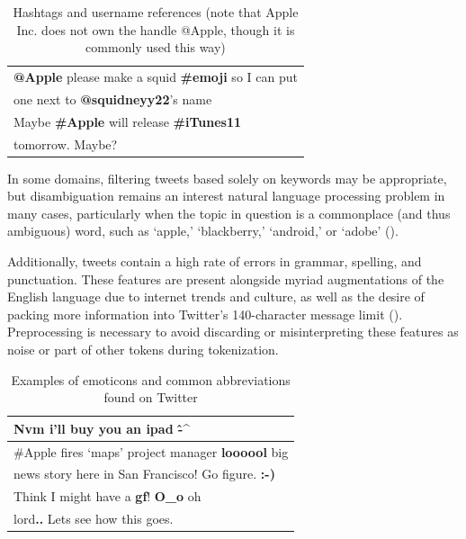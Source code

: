 \documentclass[letterpaper]{article}
\begin{document}
\begin{table}[h]
\centering
\begin{tabular}{|l|}
	\hline
\textbf{@Apple} please make a squid \textbf{\#emoji} so I can put \\
one next to \textbf{@squidneyy22}'s name\\ \hline
Maybe \textbf{\#Apple} will release \textbf{\#iTunes11} \\
tomorrow. Maybe? \\ \hline
\end{tabular}
\caption{Hashtags and username references (note that Apple Inc. does not own the handle @Apple, though it is commonly used this way)}
\label{tab:myfirsttable}
\end{table}

In some domains, filtering tweets based solely on keywords may be appropriate, but disambiguation remains an interest natural language processing problem in many cases, particularly when the topic in question is a commonplace (and thus ambiguous) word, such as `apple,' `blackberry,' `android,' or `adobe' (\citeauthor{journals/ijcsa/YervaMA12}). 

Additionally, tweets contain a high rate of errors in grammar, spelling, and punctuation. These features are present alongside myriad augmentations of the English language due to internet trends and culture, as well as the desire of packing more information into Twitter's 140-character message limit (\citeauthor{Laboreiro:2010:TMM:1871840.1871853}). Preprocessing is necessary to avoid discarding or misinterpreting these features as noise or part of other tokens during tokenization.

\begin{table}[h]
\centering
\begin{tabular}{|l|}
	\hline
\textbf{Nvm} i'll buy you an ipad \textbf{\^-\^} \\ \hline
\#Apple fires `maps' project manager \textbf{loooool} big \\
 news story here in San Francisco! Go figure. \textbf{:-)} \\ \hline
Think I might have a \textbf{gf}! \textbf{O\_o} oh \\
lord\textbf{..} Lets see how this goes. \\ \hline
\end{tabular}
\caption{Examples of emoticons and common abbreviations found on Twitter}
\label{tab:myfirsttable}
\end{table}
\end{document}
